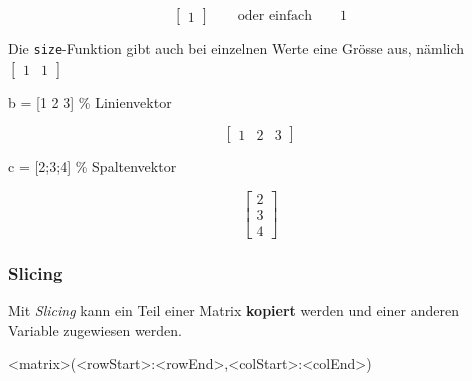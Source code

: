 \documentclass[
  10pt,
  a4paper,
  german]{article}
\newenvironment{Shaded}{}{}
\newcommand{\CommentTok}[1]{\textcolor[rgb]{0.42,0.45,0.49}{#1}}
\newcommand{\FloatTok}[1]{\textcolor[rgb]{0.00,0.36,0.77}{#1}}
\newcommand{\NormalTok}[1]{\textcolor[rgb]{0.14,0.16,0.18}{#1}}
\newcommand{\OperatorTok}[1]{\textcolor[rgb]{0.14,0.16,0.18}{#1}}
\newcommand{\VariableTok}[1]{\textcolor[rgb]{0.89,0.38,0.04}{#1}}
\numberwithin{equation}{section}
\begin{document}
\begin{multicols}{2}
\[
\begin{bmatrix}
1
\end{bmatrix}\qquad \text{oder einfach}\qquad 1 
\]

Die \texttt{size}-Funktion gibt auch bei einzelnen Werte eine Grösse
aus, nämlich \(\begin{bmatrix}1 & 1\end{bmatrix}\)

\begin{Shaded}
\begin{Highlighting}[]
\VariableTok{b} \OperatorTok{=}\NormalTok{ [}\FloatTok{1} \FloatTok{2} \FloatTok{3}\NormalTok{] }\CommentTok{\% Linienvektor}
\end{Highlighting}
\end{Shaded}

\[
\begin{bmatrix}
1 & 2 & 3
\end{bmatrix}
\]

\begin{Shaded}
\begin{Highlighting}[]
\VariableTok{c} \OperatorTok{=}\NormalTok{ [}\FloatTok{2}\OperatorTok{;}\FloatTok{3}\OperatorTok{;}\FloatTok{4}\NormalTok{] }\CommentTok{\% Spaltenvektor}
\end{Highlighting}
\end{Shaded}

\[
\begin{bmatrix}
2 \\ 3 \\ 4
\end{bmatrix}
\]

\hypertarget{slicing}{%
\subsubsection{Slicing}\label{slicing}}

Mit \emph{Slicing} kann ein Teil einer Matrix \textbf{kopiert} werden
und einer anderen Variable zugewiesen werden.

\begin{Shaded}
\begin{Highlighting}[]
\OperatorTok{\textless{}}\VariableTok{matrix}\OperatorTok{\textgreater{}}\NormalTok{(}\OperatorTok{\textless{}}\VariableTok{rowStart}\OperatorTok{\textgreater{}:\textless{}}\VariableTok{rowEnd}\OperatorTok{\textgreater{},\textless{}}\VariableTok{colStart}\OperatorTok{\textgreater{}:\textless{}}\VariableTok{colEnd}\OperatorTok{\textgreater{}}\NormalTok{)}
\end{Highlighting}
\end{Shaded}


\end{multicols}
\end{document}
